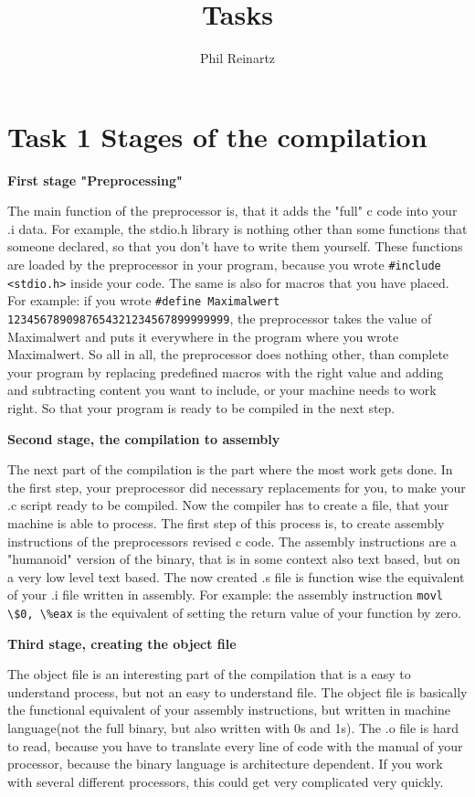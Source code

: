 \documentclass{article}
\title{Tasks}
\author{Phil Reinartz}
\begin{document}
\maketitle


\section{Task 1 Stages of the compilation}

\textbf{First stage "Preprocessing"}

The main function of the preprocessor is, that it adds the "full" c code into your .i data. For example, the stdio.h library is nothing other than some functions that someone declared, so that you don't have to write them yourself. These functions are loaded by the preprocessor in your program, because you wrote \verb!#include <stdio.h>! inside your code. The same is also for macros that you have placed. For example: if you wrote \verb!#define Maximalwert 1234567890987654321234567899999999!, the preprocessor takes the value of Maximalwert and puts it everywhere in the program where you wrote Maximalwert. So all in all, the preprocessor does nothing other, than complete your program by replacing predefined macros with the right value and adding and subtracting content you want to include, or your machine needs to work right. So that your program is ready to be compiled in the next step.

\singlespacing

\textbf{Second stage, the compilation to assembly}

The next part of the compilation is the part where the most work gets done. In the first step, your preprocessor did necessary replacements for you, to make your .c script ready to be compiled. Now the compiler has to create a file, that your machine is able to process. The first step of this process is, to create assembly instructions of the preprocessors revised c code. The assembly instructions are a "humanoid" version of the binary, that is in some context also text based, but on a very low level text based. The now created .s file is function wise the equivalent of your .i file written in assembly. For example: the assembly instruction  \verb!movl    \$0, \%eax! is the equivalent of setting the return value of your function by zero.

\singlespacing

\textbf{Third stage, creating the object file}

The object file is an interesting part of the compilation that is a easy to understand process, but not an easy to understand file. The object file is basically the functional equivalent of your assembly instructions, but written in machine language(not the full binary, but also written with 0s and 1s). The .o file is hard to read, because you have to translate every line of code with the manual of your processor, because the binary language is architecture dependent. If you work with several different processors, this could get very complicated very quickly.
\end{document}
